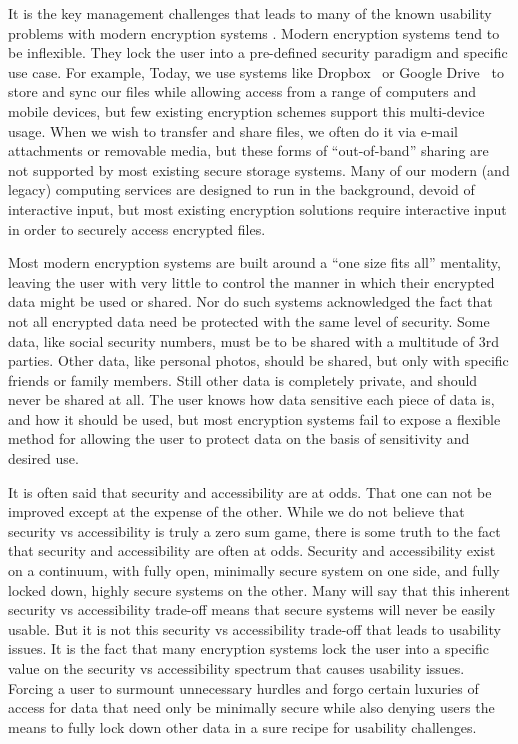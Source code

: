 It is the key management challenges that leads to many of the known
usability problems with modern encryption systems \cite{Whitten1999,
  Sweikata2009, Kher2005}. Modern encryption systems tend to be
inflexible. They lock the user into a pre-defined security paradigm
and specific use case. For example, Today, we use systems like
Dropbox~\cite{dropbox} or Google Drive~\cite{google-drive} to store
and sync our files while allowing access from a range of computers and
mobile devices, but few existing encryption schemes support this
multi-device usage. When we wish to transfer and share files, we often
do it via e-mail attachments or removable media, but these forms of
``out-of-band'' sharing are not supported by most existing secure
storage systems. Many of our modern (and legacy) computing services
are designed to run in the background, devoid of interactive input,
but most existing encryption solutions require interactive input in
order to securely access encrypted files.

Most modern encryption systems are built around a ``one size fits
all'' mentality, leaving the user with very little to control the
manner in which their encrypted data might be used or shared. Nor do
such systems acknowledged the fact that not all encrypted data need be
protected with the same level of security. Some data, like social
security numbers, must be to be shared with a multitude of 3rd
parties. Other data, like personal photos, should be shared, but only
with specific friends or family members. Still other data is
completely private, and should never be shared at all. The user knows
how data sensitive each piece of data is, and how it should be used,
but most encryption systems fail to expose a flexible method for
allowing the user to protect data on the basis of sensitivity and
desired use.

It is often said that security and accessibility are at odds. That one
can not be improved except at the expense of the other. While we do
not believe that security vs accessibility is truly a zero sum game,
there is some truth to the fact that security and accessibility are
often at odds. Security and accessibility exist on a continuum, with fully
open, minimally secure system on one side, and fully locked down,
highly secure systems on the other. Many will say that this inherent
security vs accessibility trade-off means that secure systems will never
be easily usable. But it is not this security vs accessibility trade-off
that leads to usability issues. It is the fact that many encryption
systems lock the user into a specific value on the security vs
accessibility spectrum that causes usability issues. Forcing a user to
surmount unnecessary hurdles and forgo certain luxuries of access for
data that need only be minimally secure while also denying users the
means to fully lock down other data in a sure recipe for usability
challenges.

